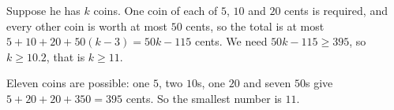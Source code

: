 Suppose he has $k$ coins. One coin of each of $5$, $10$ and $20$ cents is required, and every other coin is worth at most $50$ cents, so the total is at most $5+10+20+50(k-3)=50k-115$ cents. We need $50k-115\ge395$, so $k\ge10.2$, that is $k\ge11$.

Eleven coins are possible: one $5$, two $10$s, one $20$ and seven $50$s give $5+20+20+350=395$ cents. So the smallest number is $\boxed{11}$.
